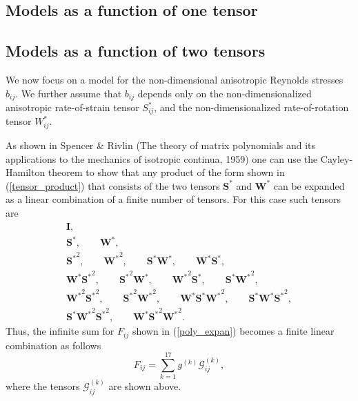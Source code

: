 \documentclass[oneside,a4paper,11pt]{report}
\newcommand{\nars}{b}           %
\newcommand{\Stau}{S^*}
\newcommand{\Wtau}{W^*}
\begin{document}
\subsection{Models as a function of one tensor}

\subsection{Models as a function of two tensors}
We now focus on a model for the non-dimensional anisotropic Reynolds stresses $\nars_{ij}$. We further assume that $\nars_{ij}$ depends only on the non-dimensionalized anisotropic rate-of-strain tensor $\Stau_{ij}$, and the non-dimensionalized rate-of-rotation tensor $\Wtau_{ij}$. 

As shown in Spencer \& Rivlin (The theory of matrix polynomials and its applications to the mechanics of isotropic continua, 1959) one can use the Cayley-Hamilton theorem to show that any product of the form shown in (\ref{tensor_product}) that consists of  the two tensors $\mathbf{\Stau}$ and $\mathbf{\Wtau}$ can be expanded as a linear combination of a finite number of tensors. For this case such tensors are
\begin{gather}
\mathbf{I}, \nonumber \\
\mathbf{\Stau}, \qquad \mathbf{\Wtau}, \nonumber \\
\mathbf{\Stau}^2, \qquad \mathbf{\Wtau}^2, \qquad \mathbf{\Stau} \mathbf{\Wtau}, \qquad \mathbf{\Wtau} \mathbf{\Stau}, \nonumber \\
\mathbf{\Wtau} \mathbf{\Stau}^2, \qquad \mathbf{\Stau}^2 \mathbf{\Wtau}, \qquad \mathbf{\Wtau}^2 \mathbf{\Stau}, \qquad \mathbf{\Stau} \mathbf{\Wtau}^2, \nonumber \\
\mathbf{\Wtau}^2 \mathbf{\Stau}^2, \qquad \mathbf{\Stau}^2 \mathbf{\Wtau}^2, \qquad \mathbf{\Wtau} \mathbf{\Stau} \mathbf{\Wtau}^2, \qquad \mathbf{\Stau} \mathbf{\Wtau} \mathbf{\Stau}^2, \nonumber \\
\mathbf{\Stau} \mathbf{\Wtau}^2 \mathbf{\Stau}^2, \qquad \mathbf{\Wtau} \mathbf{\Stau}^2 \mathbf{\Wtau}^2.
\end{gather}
Thus, the infinite sum for $F_{ij}$ shown in (\ref{poly_expan}) becomes a finite linear combination as follows
\begin{equation}
\label{rs_algebraic_model}
F_{ij} = \sum_{k = 1}^{17} g^{(k)}\mathcal{G}_{ij}^{(k)},
\end{equation}
where the tensors $\mathcal{G}_{ij}^{(k)}$ are shown above.
\end{document}
